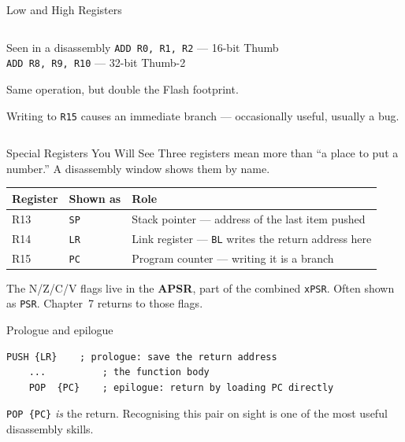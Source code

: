 \documentclass[9pt,aspectratio=169,xcolor=table]{beamer}
\newcommand{\striped}{\rowcolors{1}{white}{stripe}}
\begin{document}
\begin{frame}[plain]{Low and High Registers}
\begin{columns}[c]
\begin{column}{.5\textwidth}
        \vspace{3mm}
        \begin{block}{Seen in a disassembly}
            {\small \texttt{ADD R0, R1, R2} --- 16-bit Thumb\\
            \texttt{ADD R8, R9, R10} --- 32-bit Thumb-2}

            \vspace{1mm}
            {\small Same operation, but \alert{double} the Flash footprint.}
        \end{block}

        \vspace{3mm}
        {\small Writing to \texttt{R15} causes an immediate branch ---
        occasionally useful, usually a bug.}
    \end{column}
    \end{columns}
\end{frame}

\begin{frame}[fragile]{Special Registers You Will See}
    \leavevmode
    {\small Three registers mean more than ``a place to put a number.''
    A disassembly window shows them by name.}

    \vspace{2mm}
    \begin{center}
    {\small
    \striped
    \begin{tabular}{@{}l l R{.5\textwidth}@{}}
        \toprule
        \textbf{Register} & \textbf{Shown as} & \textbf{Role} \\
        \midrule
        R13 & \texttt{SP} & Stack pointer --- address of the last item pushed \\
        R14 & \texttt{LR} & Link register --- \texttt{BL} writes the return address here \\
        R15 & \texttt{PC} & Program counter --- writing it is a branch \\
        \bottomrule
    \end{tabular}}
    \end{center}

    \vspace{2mm}
    {\small The N/Z/C/V flags live in the \textbf{APSR}, part of the
    combined \texttt{xPSR}. Often shown as \texttt{PSR}. Chapter~7 returns
    to those flags.}

    \vspace{2mm}
    \begin{block}{Prologue and epilogue}
        \begin{lstlisting}[style=armasm, language=ARM, basicstyle=\normalsize\ttfamily]
	PUSH {LR}    ; prologue: save the return address
	...          ; the function body
	POP  {PC}    ; epilogue: return by loading PC directly
        \end{lstlisting}

        {\footnotesize \texttt{POP \{PC\}} \emph{is} the return. Recognising
        this pair on sight is one of the most useful disassembly skills.}
    \end{block}
\end{frame}
\end{document}
